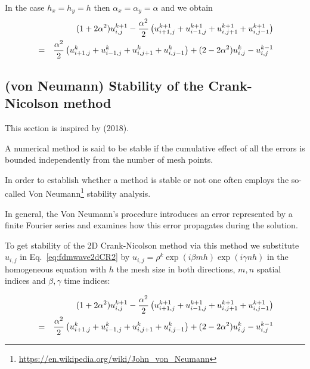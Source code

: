 In the case $h_x=h_y=h$ then $\alpha_x=\alpha_y=\alpha$ and we obtain
\begin{eqnarray}
&&(1+2\alpha^2) u_{i,j}^{k+1} 
-\frac{\alpha^2}{2} \left( u_{i+1,j}^{k+1}  +u_{i-1,j}^{k+1}  
+ u_{i,j+1}^{k+1}  +u_{i,j-1}^{k+1} \right) \nonumber\\
&=&
\frac{\alpha^2}{2} \left( u_{i+1,j}^{k}  +u_{i-1,j}^{k}  
+ u_{i,j+1}^{k}  +u_{i,j-1}^{k}  \right)
+(2-2\alpha^2)u_{i,j}^{k} -u_{i,j}^{k-1}  \label{eq:fdmwave2dCR2}
\end{eqnarray}







\subsection{(von Neumann) Stability of the Crank-Nicolson method}

This section is inspired by \textcite{degefa2018} (2018).

\vspace{.5cm}

A numerical method is said to be stable if the cumulative effect of all the errors is
bounded independently from the number of mesh points. 

In order to establish whether a method is stable or not one often employs the so-called
Von Neumann\footnote{\url{https://en.wikipedia.org/wiki/John_von_Neumann}} stability analysis.

In general, the Von Neumann’s procedure
introduces an error represented by a finite Fourier series and examines how this error
propagates during the solution. 

To get stability of the 2D Crank-Nicolson method via this method we substitute
$u_{i,j}$ in Eq.~\eqref{eq:fdmwave2dCR2} by $u_{i,j}=\rho^k \exp (i\beta mh) \exp (i \gamma n h)$
in the homogeneous equation with
$h$ the mesh size in both directions, $m,n$ spatial indices and $\beta,\gamma$ time indices:

\begin{eqnarray}
&&(1+2\alpha^2) u_{i,j}^{k+1} 
-\frac{\alpha^2}{2} \left( u_{i+1,j}^{k+1}  +u_{i-1,j}^{k+1}  
+ u_{i,j+1}^{k+1}  +u_{i,j-1}^{k+1} \right) \nonumber\\
&=&
\frac{\alpha^2}{2} \left( u_{i+1,j}^{k}  +u_{i-1,j}^{k}  
+ u_{i,j+1}^{k}  +u_{i,j-1}^{k}  \right)
+(2-2\alpha^2)u_{i,j}^{k} -u_{i,j}^{k-1} 
\end{eqnarray}



